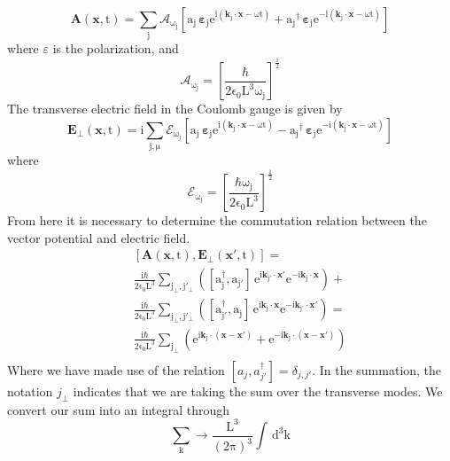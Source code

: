 \documentclass[twocolumn,english,pra,aps,superscriptaddress,floatfix]{revtex4-1}
\begin{document}
\begin{equation}
\mathrm{\mathbf{A}(\mathbf{x},t)=\sum_j\mathcal{A}_{\omega_j}\left[a_j\,\mathbf{\varepsilon}_j e^{i(\mathbf{k}_j\cdot\mathbf{x}-\omega t)}+{a_j}^{\dagger}\,\mathbf{\varepsilon}_j e^{-i(\mathbf{k}_j\cdot\mathbf{x}-\omega t)}\right]}
\end{equation}
where $\varepsilon$ is the polarization, and
\begin{equation}
\mathrm{\mathcal{A}_{\omega_j}=\left[\frac{\hbar}{2\epsilon_0 L^3\omega_j}\right]^{\frac{1}{2}}}
\end{equation} 
The transverse electric field in the Coulomb gauge is given by
\begin{equation}
\mathrm{\mathbf{E}_{\perp}(\mathbf{x},t)=i\sum_{j,\mu}\mathcal{E}_{\omega_j}\left[a_j\,\mathbf{\varepsilon}_j e^{i(\mathbf{k}_j\cdot\mathbf{x}-\omega t)}-{a_j}^{\dagger}\,\mathbf{\varepsilon}_j e^{-i(\mathbf{k}_j\cdot\mathbf{x}-\omega t)}\right]}
\end{equation}
where
\begin{equation}
\mathrm{\mathcal{E}_{\omega_j}=\left[\frac{\hbar\omega_j}{2\epsilon_0 L^3}\right]^{\frac{1}{2}}}
\end{equation} 
From here it is necessary to determine the commutation relation between the vector potential and electric field.
\begin{eqnarray}
&&\mathrm{[\mathbf{A}(\mathbf{x},t),\mathbf{E}_{\perp}(\mathbf{x}',t)]=} \nonumber \\
&&\mathrm{\frac{i\hbar}{2\epsilon_0 L^3}\sum_{j_{\perp},j'_{\perp}}\left(\left[a^{\dagger}_{j},a_{j'}\right]\,e^{i\mathbf{k}_{j'}\cdot\mathbf{x'}}e^{-i\mathbf{k}_{j}\cdot\mathbf{x}}\right)+} \nonumber \\
&&\mathrm{\frac{i\hbar}{2\epsilon_0 L^3}\sum_{j_{\perp},j'_{\perp}}\left(\left[a^{\dagger}_{j'},a_{j}\right]\,e^{i\mathbf{k}_{j}\cdot\mathbf{x}}e^{-i\mathbf{k}_{j'}\cdot\mathbf{x'}}\right)=} \nonumber \\
&&\mathrm{\frac{i\hbar}{2\epsilon_0 L^3}\sum_{j_{\perp}}\left(e^{i\mathbf{k}_j\cdot(\mathbf{x}-\mathbf{x}')}+e^{-i\mathbf{k}_j\cdot(\mathbf{x}-\mathbf{x}')}\right)} \nonumber \\
\end{eqnarray}
Where we have made use of the relation $[a_j,a^{\dagger}_{j'}]=\delta_{j,j'}$.  In the summation, the notation $j_{\perp}$ indicates that we are taking the sum over the transverse modes. We convert our sum into an integral through \cite{loudonbook}
\begin{equation}
\mathrm{\sum_{k}\rightarrow \frac{L^3}{(2\pi)^3}\int\,d^3k}
\end{equation}
\end{document}

